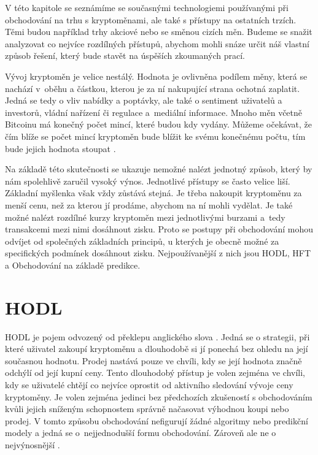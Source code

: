 V této kapitole se seznámíme se současnými technologiemi používanými při obchodování na trhu s kryptoměnami, ale také s přístupy na ostatních trzích.
Těmi budou například trhy akciové nebo se směnou cizích měn.
Budeme se snažit analyzovat co nejvíce rozdílných přístupů, abychom mohli snáze určit náš vlastní způsob řešení, který bude stavět na úspěších zkoumaných prací.

Vývoj kryptoměn je velice nestálý. 
Hodnota je ovlivněna podílem měny, která se nachází v~oběhu a částkou, kterou je za ní nakupující strana ochotná zaplatit. 
Jedná se tedy o vliv nabídky a poptávky, ale také o sentiment uživatelů a investorů, vládní nařízení či regulace a~mediální informace. 
Mnoho měn včetně Bitcoinu má konečný počet mincí, které budou kdy vydány. 
Můžeme očekávat, že čím blíže se počet mincí kryptoměn bude blížit ke svému konečnému počtu, tím bude jejich hodnota stoupat \cite{volatile}.

Na základě této skutečnosti se ukazuje nemožné nalézt jednotný způsob, který by nám spolehlivě zaručil vysoký výnos. 
Jednotlivé přístupy se často velice liší. 
Základní myšlenka však vždy zůstává stejná. 
Je třeba nakoupit kryptoměnu za menší cenu, než za kterou jí prodáme, abychom na ní mohli vydělat. 
Je také možné nalézt rozdílné kurzy kryptoměn mezi jednotlivými burzami a~tedy transakcemi mezi nimi dosáhnout zisku. 
Proto se postupy při obchodování mohou odvíjet od společných základních principů, u kterých je obecně možné za specifických podmínek dosáhnout zisku. 
Nejpoužívanější z nich jsou HODL, HFT a Obchodování na základě predikce.

\section{HODL}

HODL je pojem odvozený od překlepu anglického slova . 
Jedná se o strategii, při které uživatel zakoupí kryptoměnu a dlouhodobě si jí ponechá bez ohledu na její současnou hodnotu. 
Prodej nastává pouze ve chvíli, kdy se její hodnota značně odchýlí od její kupní ceny. 
Tento dlouhodobý přístup je volen zejména ve chvíli, kdy se uživatelé chtějí co nejvíce oprostit od aktivního sledování vývoje ceny kryptoměny. 
Je volen zejména jedinci bez předchozích zkušeností s obchodováním kvůli jejich sníženým schopnostem správně načasovat výhodnou koupi nebo prodej.  
V tomto způsobu obchodování nefigurují žádné algoritmy nebo predikční modely a jedná se o~nejjednodušší formu obchodování. 
Zároveň ale ne o nejvýnosnější \cite{hodl}.

